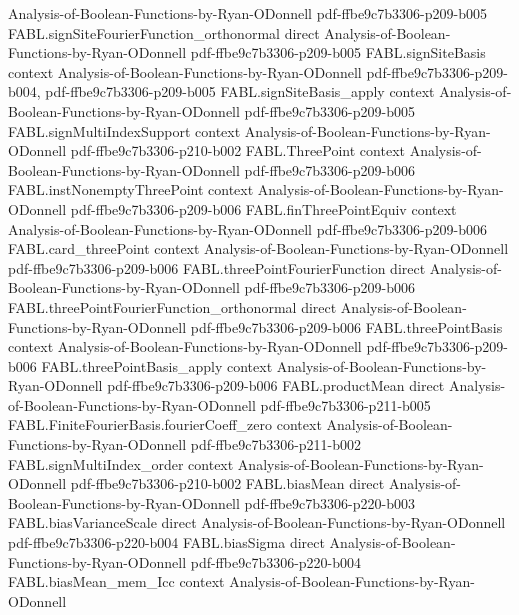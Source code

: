 \begin{theorem}
  {Analysis-of-Boolean-Functions-by-Ryan-ODonnell}
  {pdf-ffbe9c7b3306-p209-b005}
\proofstep
  {FABL.signSiteFourierFunction_orthonormal}
  {direct}
  {Analysis-of-Boolean-Functions-by-Ryan-ODonnell}
  {pdf-ffbe9c7b3306-p209-b005}
\proofstep
  {FABL.signSiteBasis}
  {context}
  {Analysis-of-Boolean-Functions-by-Ryan-ODonnell}
  {pdf-ffbe9c7b3306-p209-b004,
    pdf-ffbe9c7b3306-p209-b005}
\proofstep
  {FABL.signSiteBasis_apply}
  {context}
  {Analysis-of-Boolean-Functions-by-Ryan-ODonnell}
  {pdf-ffbe9c7b3306-p209-b005}
\proofstep
  {FABL.signMultiIndexSupport}
  {context}
  {Analysis-of-Boolean-Functions-by-Ryan-ODonnell}
  {pdf-ffbe9c7b3306-p210-b002}
\proofstep
  {FABL.ThreePoint}
  {context}
  {Analysis-of-Boolean-Functions-by-Ryan-ODonnell}
  {pdf-ffbe9c7b3306-p209-b006}
\proofstep
  {FABL.instNonemptyThreePoint}
  {context}
  {Analysis-of-Boolean-Functions-by-Ryan-ODonnell}
  {pdf-ffbe9c7b3306-p209-b006}
\proofstep
  {FABL.finThreePointEquiv}
  {context}
  {Analysis-of-Boolean-Functions-by-Ryan-ODonnell}
  {pdf-ffbe9c7b3306-p209-b006}
\proofstep
  {FABL.card_threePoint}
  {context}
  {Analysis-of-Boolean-Functions-by-Ryan-ODonnell}
  {pdf-ffbe9c7b3306-p209-b006}
\proofstep
  {FABL.threePointFourierFunction}
  {direct}
  {Analysis-of-Boolean-Functions-by-Ryan-ODonnell}
  {pdf-ffbe9c7b3306-p209-b006}
\proofstep
  {FABL.threePointFourierFunction_orthonormal}
  {direct}
  {Analysis-of-Boolean-Functions-by-Ryan-ODonnell}
  {pdf-ffbe9c7b3306-p209-b006}
\proofstep
  {FABL.threePointBasis}
  {context}
  {Analysis-of-Boolean-Functions-by-Ryan-ODonnell}
  {pdf-ffbe9c7b3306-p209-b006}
\proofstep
  {FABL.threePointBasis_apply}
  {context}
  {Analysis-of-Boolean-Functions-by-Ryan-ODonnell}
  {pdf-ffbe9c7b3306-p209-b006}
\proofstep
  {FABL.productMean}
  {direct}
  {Analysis-of-Boolean-Functions-by-Ryan-ODonnell}
  {pdf-ffbe9c7b3306-p211-b005}
\proofstep
  {FABL.FiniteFourierBasis.fourierCoeff_zero}
  {context}
  {Analysis-of-Boolean-Functions-by-Ryan-ODonnell}
  {pdf-ffbe9c7b3306-p211-b002}
\proofstep
  {FABL.signMultiIndex_order}
  {context}
  {Analysis-of-Boolean-Functions-by-Ryan-ODonnell}
  {pdf-ffbe9c7b3306-p210-b002}
\proofstep
  {FABL.biasMean}
  {direct}
  {Analysis-of-Boolean-Functions-by-Ryan-ODonnell}
  {pdf-ffbe9c7b3306-p220-b003}
\proofstep
  {FABL.biasVarianceScale}
  {direct}
  {Analysis-of-Boolean-Functions-by-Ryan-ODonnell}
  {pdf-ffbe9c7b3306-p220-b004}
\proofstep
  {FABL.biasSigma}
  {direct}
  {Analysis-of-Boolean-Functions-by-Ryan-ODonnell}
  {pdf-ffbe9c7b3306-p220-b004}
\proofstep
  {FABL.biasMean_mem_Icc}
  {context}
  {Analysis-of-Boolean-Functions-by-Ryan-ODonnell}

\end{theorem}
